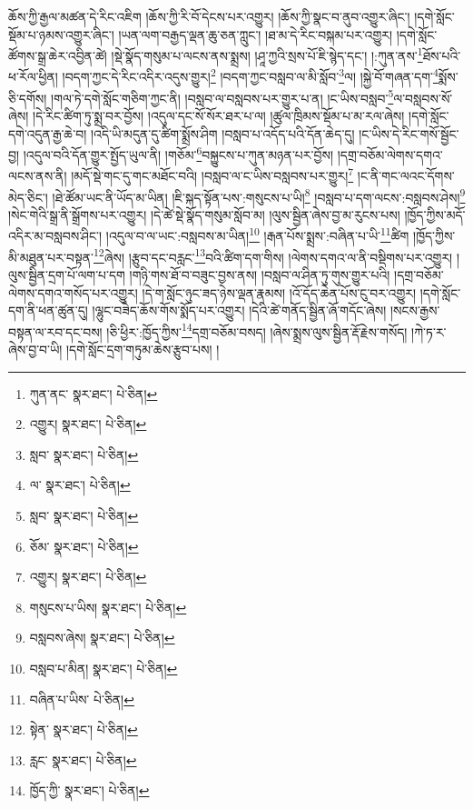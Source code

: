 ཆོས་ཀྱི་རྒྱལ་མཚན་དེ་རིང་འཇིག །ཆོས་ཀྱི་རི་བོ་དེངས་པར་འགྱུར། །ཆོས་ཀྱི་སྣང་བ་ནུབ་འགྱུར་ཞིང་། །དགེ་སློང་སྡོམ་པ་ཉམས་འགྱུར་ཞིང་། །ཡན་ལག་བརྒྱད་ལྡན་ཆུ་ཅན་ཀླུང་། །ཐ་མ་དེ་རིང་བསྐམ་པར་འགྱུར། །དགེ་སློང་ཚོགས་སྒྲ་ཆེར་འབྱིན་ཚེ། །སྡེ་སྣོད་གསུམ་པ་ལངས་ནས་སྨྲས། །ཤཱ་ཀྱའི་སྲས་པོ་ཇི་སྙེད་དང་། །:ཀུན་ནས་\footnote{ཀུན་ནང་  སྣར་ཐང་།  པེ་ཅིན། }ཐོས་པའི་ཕ་རོལ་ཕྱིན། །བདག་ཀྱང་དེ་རིང་འདིར་འདུས་གྱུར།\footnote{འགྱུར།  སྣར་ཐང་།  པེ་ཅིན། } །བདག་ཀྱང་བསླབ་ལ་མི་སློབ་\footnote{སླབ་  སྣར་ཐང་།  པེ་ཅིན། }ལ། །སྐྱེ་བོ་གཞན་དག་\footnote{ལ་  སྣར་ཐང་།  པེ་ཅིན། }སྨོས་ཅི་དགོས། །གལ་ཏེ་དགེ་སློང་གཅིག་ཀྱང་ནི། །བསླབ་ལ་བསླབས་པར་གྱུར་པ་ན། །ང་ཡིས་བསླབ་\footnote{སླབ་  སྣར་ཐང་།  པེ་ཅིན། }ལ་བསླབས་སོ་ཞེས། །དེ་རིང་ཚིག་ཏུ་སྨྲ་བར་བྱོས། །འདུལ་དང་སོ་སོར་ཐར་པ་ལ། །ཚུལ་ཁྲིམས་སྡོམ་པ་མ་རལ་ཞེས། །དགེ་སློང་དགེ་འདུན་རྒྱ་ཆེ་བ། །འདི་ཡི་མདུན་དུ་ཚིག་སྨྲོས་ཤིག །བསླབ་པ་འདོད་པའི་དོན་ཆེད་དུ། །ང་ཡིས་དེ་རིང་གསོ་སྦྱོང་བྱ། །འདུལ་བའི་དོན་གྱུར་སྤྱོད་ཡུལ་ནི། །གཅོམ་\footnote{ཅོམ་  སྣར་ཐང་།  པེ་ཅིན། }བསྐྱུངས་པ་ཀུན་མཉན་པར་བྱོས། །དགྲ་བཅོམ་ལེགས་དགའ་ལངས་ནས་ནི། །མདོ་སྡེ་གང་དུ་གང་མཐོང་བའི། །བསླབ་ལ་ང་ཡིས་བསླབས་པར་གྱུར།\footnote{འགྱུར།  སྣར་ཐང་།  པེ་ཅིན། } །ང་ནི་གང་ལའང་དོགས་མེད་ཅིང་། །ཐེ་ཚོམ་ཡང་ནི་ཡོད་མ་ཡིན། །ཇི་སྐད་སྟོན་པས་:གསུངས་པ་ཡི།\footnote{གསུངས་པ་ཡིས།  སྣར་ཐང་།  པེ་ཅིན། } །བསླབ་པ་དག་ལངས་:བསླབས་ཤེས།\footnote{བསླབས་ཞེས།  སྣར་ཐང་།  པེ་ཅིན། } །སེང་གེའི་སྒྲ་ནི་སྒྲོགས་པར་འགྱུར། །དེ་ཚེ་སྡེ་སྣོད་གསུམ་སློབ་མ། །ལུས་སྦྱིན་ཞེས་བྱ་མ་རུངས་པས། །ཁྱོད་ཀྱིས་མདོ་འདིར་མ་བསླབས་ཤིང་། །འདུལ་བ་ལ་ཡང་:བསླབས་མ་ཡིན།\footnote{བསླབ་པ་མིན།  སྣར་ཐང་།  པེ་ཅིན། } །རྒན་པོས་སྨྲས་:བཞིན་པ་ཡི་\footnote{བཞིན་པ་ཡིས་  པེ་ཅིན། }ཚིག །ཁྱོད་ཀྱིས་མི་མཐུན་པར་བསྟན་\footnote{སྟེན་  སྣར་ཐང་།  པེ་ཅིན། }ཞེས། །རྩུབ་དང་བརླང་\footnote{རླང་  སྣར་ཐང་།  པེ་ཅིན། }བའི་ཚིག་དག་གིས། །ལེགས་དགའ་ལ་ནི་བསྡིགས་པར་འགྱུར། །ལུས་སྦྱིན་དྲག་པོ་ལག་པ་དག །གཉི་གས་ཐོ་བ་བཟུང་བྱས་ནས། །བསླབ་ལ་ཤིན་ཏུ་གུས་གྱུར་པའི། །དགྲ་བཅོམ་ལེགས་དགའ་གསོད་པར་འགྱུར། །དེ་ག་སློང་ཉུང་ཟད་ཉེས་ལྡན་རྣམས། །འོ་དོད་ཆེན་པོས་ངུ་བར་འགྱུར། །དགེ་སློང་དག་ནི་ཕན་ཚུན་དུ། །ལྷུང་བཟེད་ཆོས་གོས་སྨོད་པར་འགྱུར། །དེའི་ཚེ་གནོད་སྦྱིན་ཞོ་གདོང་ཞེས། །སངས་རྒྱས་བསྟན་ལ་རབ་དང་བས། །ཅི་ཕྱིར་:ཁྱོད་ཀྱིས་\footnote{ཁྱོད་ཀྱི་  སྣར་ཐང་།  པེ་ཅིན། }དགྲ་བཅོམ་བསད། །ཞེས་སྨྲས་ལུས་སྦྱིན་རྡོ་རྗེས་གསོད། །ཀེ་ཏ་ར་ཞེས་བྱ་བ་ཡི། །དགེ་སློང་དྲག་གཏུམ་ཆེས་རྩུབ་པས། །
